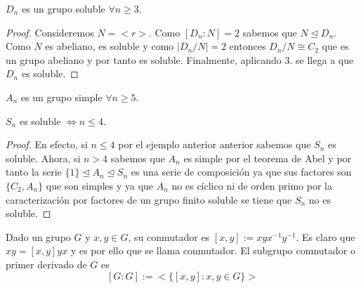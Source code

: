 \begin{ncor}
$D_n$ es un grupo soluble $\forall n \ge 3$.
\end{ncor}
\begin{proof}
Consideremos $N = <r>$. Como $[D_n:N] = 2$ sabemos que $N \trianglelefteq D_n$. Como $N$ es abeliano, es soluble y como $|D_n/N| = 2$ entonces $D_n/N \cong C_2$ que es un grupo abeliano y por tanto es soluble. Finalmente, aplicando 3. se llega a que $D_n$ es soluble.
\end{proof}

\begin{nth}
$A_n$ es un grupo simple $\forall n \ge 5$.
\end{nth}

\begin{ncor}
$S_n$ es soluble $\iff n \le 4$.
\end{ncor}
\begin{proof}
En efecto, si $n \le 4$ por el ejemplo anterior anterior sabemos que $S_n$ es soluble. Ahora, si $n > 4$ sabemos que $A_n$ es simple por el teorema de Abel y por tanto la serie $\{1\} \trianglelefteq A_n \trianglelefteq S_n$ es una serie de composición ya que sus factores son $\{C_2,A_n\}$ que son simples y ya que $A_n$ no es cíclico ni de orden primo por la caracterización por factores de un grupo finito soluble se tiene que $S_n$ no es soluble.
\end{proof}

\begin{ndef}
Dado un grupo $G$ y $x,y \in G$, su conmutador es $[x,y] := xyx^{-1}y^{-1}$. Es claro que $xy = [x,y]yx$ y es por ello que se llama conmutador. El subgrupo conmutador o primer derivado de $G$ es $$[G:G] := <\{[x,y]:x,y \in G\}>$$
\end{ndef}

